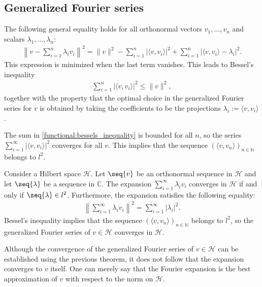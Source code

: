 \subsection{Generalized Fourier series}

    \begin{property}
        The following general equality holds for all orthonormal vectors $v_1,\ldots,v_n$ and scalars $\lambda_1,\ldots,\lambda_n$:
        \begin{gather}
            \left\|v - \sum_{i=1}^n\lambda_iv_i\right\|^2 = \|v\|^2 - \sum_{i=1}^n|\langle v,v_i \rangle|^2 + \sum_{i=1}^n|\langle v,v_i \rangle - \lambda_i|^2.
        \end{gather}
        This expression is minimized when the last term vanishes. This leads to Bessel's inequality
        \begin{gather}
            \label{functional:bessels_inequality}
            \sum_{i=1}^n|\langle v,v_i \rangle|^2\leq\|v\|^2,
        \end{gather}
        together with the property that the optimal choice in the generalized Fourier series for $v$ is obtained by taking the coefficients to be the projections $\lambda_i:=\langle v,v_i \rangle$.
    \end{property}
    \begin{result}
        The sum in \eqref{functional:bessels_inequality} is bounded for all $n$, so the series $\sum_{i=1}^\infty|\langle v,v_i \rangle|^2$ converges for all $v$. This implies that the sequence $(\langle v,v_n\rangle)_{n\in\mathbb{N}}$ belongs to $l^2$.
    \end{result}

    \begin{theorem}
        Consider a Hilbert space $\mathcal{H}$. Let $\seq{v}$ be an orthonormal sequence in $\mathcal{H}$ and let $\seq{\lambda}$ be a sequence in $\mathbb{C}$. The expansion $\sum_{i=1}^\infty\lambda_iv_i$ converges in $\mathcal{H}$ if and only if $\seq{\lambda}\in l^2$. Furthermore, the expansion satisfies the following equality:
        \begin{gather}
            \left\|\sum_{i=1}^\infty\lambda_iv_i\right\|^2 = \sum_{i=1}^\infty|\lambda_i|^2.
        \end{gather}
        Bessel's inequality implies that the sequence $(\langle v,v_n \rangle)_{n\in\mathbb{N}}$ belongs to $l^2$, so the generalized Fourier series of $v\in\mathcal{H}$ converges in $\mathcal{H}$.
    \end{theorem}
    \begin{remark}
        Although the convergence of the generalized Fourier series of $v\in\mathcal{H}$ can be established using the previous theorem, it does not follow that the expansion converges to $v$ itself. One can merely say that the Fourier expansion is the best approximation of $v$ with respect to the norm on $\mathcal{H}$.
    \end{remark}

